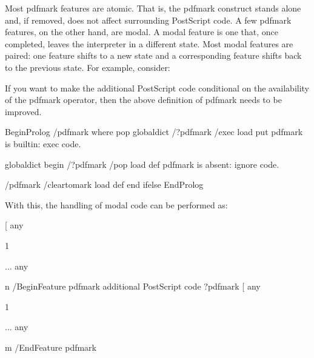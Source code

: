 \documentclass[letterpaper,12pt,english,openany,oneside]{sphinxmanual}
\begin{document}
Most pdfmark features are atomic. That is, the pdfmark construct stands alone and, if removed, does not affect surrounding PostScript code. A few pdfmark features, on the other hand, are modal. A modal feature is one that, once completed, leaves the interpreter in a different state. Most modal features are paired: one feature shifts to a new state and a corresponding feature shifts back to the previous state. For example, consider:

\begin{sphinxVerbatim}[commandchars=\\\{\}]
\PYG{p}{[} 
  
  

  

 \PYG{p}{[} 
  
  
\end{sphinxVerbatim}

If you want to make the additional PostScript code conditional on the availability of the pdfmark operator, then the above definition of pdfmark needs to be improved.

\begin{sphinxVerbatim}[commandchars=\\\{\}]
 \PYGZpc{}\PYGZpc{}BeginProlog
  /pdfmark where
      \PYGZob{} pop globaldict /?pdfmark /exec load put \PYGZcb{}
\PYGZpc{} pdfmark is built\PYGZhy{}in: exec code.

      \PYGZob{}
      globaldict
          begin
          /?pdfmark /pop load def
\PYGZpc{} pdfmark is absent: ignore code.

          /pdfmark /cleartomark load def
          end
      \PYGZcb{}
  ifelse
  \PYGZpc{}\PYGZpc{}EndProlog
\end{sphinxVerbatim}

With this, the handling of modal code can be performed as:

\begin{sphinxVerbatim}[commandchars=\\\{\}]
[
any

1

 ... any

n
 /BeginFeature pdfmark
  \PYGZob{}
additional PostScript code
 \PYGZcb{} ?pdfmark
 [
any

1

 ... any

m
 /EndFeature pdfmark
\end{sphinxVerbatim}
\end{document}
